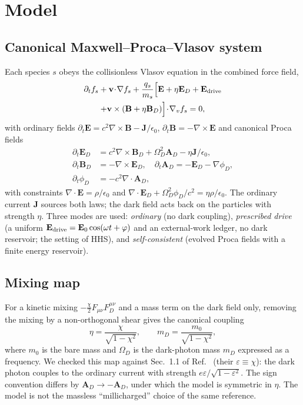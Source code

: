 \documentclass[aps,pre,reprint,floatfix,amsmath,amssymb,nofootinbib,superscriptaddress]{revtex4-2}
\begin{document}
\section{Model}\label{sec:model}
\subsection{Canonical Maxwell--Proca--Vlasov system}
Each species $s$ obeys the collisionless Vlasov equation in the combined force field,
\begin{multline}
\partial_t f_s+\mathbf v\!\cdot\!\nabla f_s+\frac{q_s}{m_s}\Big[\mathbf E+\eta\mathbf E_D+\mathbf E_{\rm drive}\\+\mathbf v\times(\mathbf B+\eta\mathbf B_D)\Big]\!\cdot\!\nabla_v f_s=0 ,
\end{multline}
with ordinary fields $\partial_t\mathbf E=c^2\nabla\times\mathbf B-\mathbf J/\epsilon_0$, $\partial_t\mathbf B=-\nabla\times\mathbf E$ and canonical Proca fields
\begin{align}
\partial_t\mathbf E_D&=c^2\nabla\times\mathbf B_D+\Omega_D^2\mathbf A_D-\eta\mathbf J/\epsilon_0,\\
\partial_t\mathbf B_D&=-\nabla\times\mathbf E_D,\quad
\partial_t\mathbf A_D=-\mathbf E_D-\nabla\phi_D,\\
\partial_t\phi_D&=-c^2\nabla\!\cdot\!\mathbf A_D ,
\end{align}
with constraints $\nabla\!\cdot\!\mathbf E=\rho/\epsilon_0$ and $\nabla\!\cdot\!\mathbf E_D+\Omega_D^2\phi_D/c^2=\eta\rho/\epsilon_0$. The ordinary current $\mathbf J$ sources both laws; the dark field acts back on the particles with strength $\eta$. Three modes are used: \emph{ordinary} (no dark coupling), \emph{prescribed drive} (a uniform $\mathbf E_{\rm drive}=\mathbf E_0\cos(\omega t+\varphi)$ and an external-work ledger, no dark reservoir; the setting of HHS), and \emph{self-consistent} (evolved Proca fields with a finite energy reservoir).

\subsection{Mixing map}
For a kinetic mixing $-\tfrac{\chi}{2}F_{\mu\nu}F_D^{\mu\nu}$ and a mass term on the dark field only, removing the mixing by a non-orthogonal shear gives the canonical coupling
\begin{equation}
\eta=\frac{\chi}{\sqrt{1-\chi^2}},\qquad m_D=\frac{m_0}{\sqrt{1-\chi^2}},
\end{equation}
where $m_0$ is the bare mass and $\Omega_D$ is the dark-photon mass $m_D$ expressed as a frequency. We checked this map against Sec.~1.1 of Ref.~\cite{Fabbrichesi2020} (their $\varepsilon\equiv\chi$): the dark photon couples to the ordinary current with strength $e\varepsilon/\sqrt{1-\varepsilon^2}$. The sign convention differs by $\mathbf A_D\to-\mathbf A_D$, under which the model is symmetric in $\eta$. The model is not the massless ``millicharged'' choice of the same reference.
\end{document}
